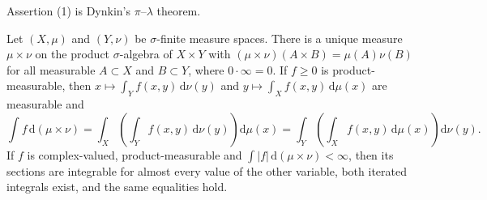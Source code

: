 Assertion (1) is Dynkin's $\pi$--$\lambda$ theorem.

\begin{proposition}\label{prop:tonelli-fubini}
Let $(X,\mu)$ and $(Y,\nu)$ be $\sigma$-finite measure spaces. There is a unique measure $\mu\times\nu$ on the product $\sigma$-algebra of $X\times Y$ with $(\mu\times\nu)(A\times B)=\mu(A)\nu(B)$ for all measurable $A\subset X$ and $B\subset Y$, where $0\cdot\infty=0$. If $f\geq0$ is product-measurable, then $x\mapsto\int_Yf(x,y)\,\mathrm d\nu(y)$ and $y\mapsto\int_Xf(x,y)\,\mathrm d\mu(x)$ are measurable and
\[
 \int f\,\mathrm d(\mu\times\nu)
 =\int_X\left(\int_Y f(x,y)\,\mathrm d\nu(y)\right)\mathrm d\mu(x)
 =\int_Y\left(\int_X f(x,y)\,\mathrm d\mu(x)\right)\mathrm d\nu(y).
\]
If $f$ is complex-valued, product-measurable and $\int|f|\,\mathrm d(\mu\times\nu)<\infty$, then its sections are integrable for almost every value of the other variable, both iterated integrals exist, and the same equalities hold.
\end{proposition}
